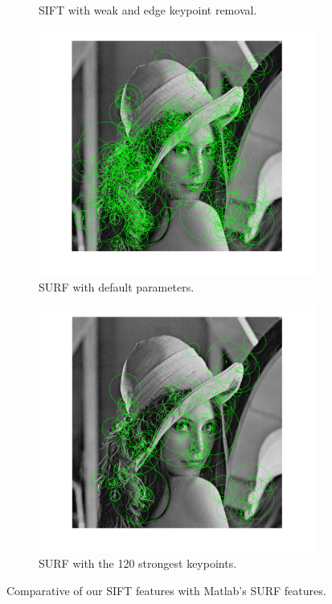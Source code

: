 \documentclass[12pt]{article}
\begin{document}
\begin{figure}[htbp!]
\begin{subfigure}[b]{0.45\textwidth}
                \caption{SIFT with weak and edge keypoint removal.}
                \label{fig:sift2}
        \end{subfigure}
        \begin{subfigure}[b]{0.45\textwidth}
                \includegraphics[width=\textwidth]{images/surf1}
                \caption{SURF with default parameters.}
                \label{fig:surf1}
        \end{subfigure}
        \begin{subfigure}[b]{0.45\textwidth}
                \includegraphics[width=\textwidth]{images/surf2}
                \caption{SURF with the 120 strongest keypoints.}
                \label{fig:surf2}
        \end{subfigure}        
        \caption{Comparative of our SIFT features with Matlab's SURF features.}\label{fig:featuresSample}
\end{figure}
\end{document}
